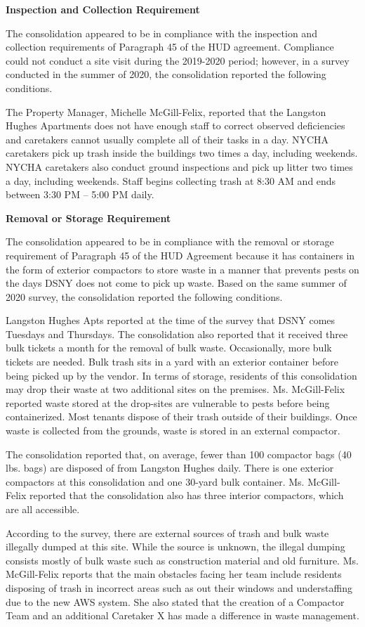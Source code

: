 

\textbf{Inspection and Collection Requirement}

The consolidation appeared to be in compliance with the inspection and collection requirements of Paragraph 45 of the HUD agreement. Compliance could not conduct a site visit during the 2019-2020 period; however, in a survey conducted in the summer of 2020, the consolidation reported the following conditions.

The Property Manager, Michelle McGill-Felix, reported that the Langston Hughes Apartments does not have enough staff to correct observed deficiencies and caretakers cannot usually complete all of their tasks in a day. NYCHA caretakers pick up trash inside the buildings two times a day, including weekends. NYCHA caretakers also conduct ground inspections and pick up litter two times a day, including weekends. Staff begins collecting trash at 8:30 AM and ends between 3:30 PM -- 5:00 PM daily.

\textbf{Removal or Storage Requirement}

The consolidation appeared to be in compliance with the  removal or storage requirement of Paragraph  45 of the HUD Agreement because it has containers in the form of exterior compactors to store waste in a manner that prevents pests on the days DSNY does not come to pick up waste. Based on the same summer of  2020 survey, the consolidation reported the following conditions.

Langston Hughes Apts reported at the time of the survey that DSNY comes Tuesdays and Thursdays. The consolidation also reported that it received three bulk tickets a month for the removal of bulk waste. Occasionally, more bulk tickets are needed. Bulk trash sits in a yard with an exterior container before being picked up by the vendor. In terms of storage, residents of this consolidation may drop their waste at two additional sites on the premises. Ms. McGill-Felix reported waste stored at the drop-sites are vulnerable to pests before being containerized. Most tenants dispose of their trash outside of their buildings. Once waste is collected from the grounds, waste is stored in an external compactor. 

The consolidation reported that, on average, fewer than 100 compactor bags (40 lbs. bags) are disposed of from Langston Hughes daily. There is one exterior compactors at this consolidation and one 30-yard bulk container. Ms. McGill-Felix reported that the consolidation also has three interior compactors, which are all accessible.

According to the survey, there are external sources of trash and bulk waste illegally dumped at this site. While the source is unknown, the illegal dumping consists mostly of bulk waste such as construction material and old furniture. Ms. McGill-Felix reports that the main obstacles facing her team include residents disposing of trash in incorrect areas such as out their windows and understaffing due to the new AWS system. She also stated that the creation of a Compactor Team and an additional Caretaker X has made a difference in waste management.